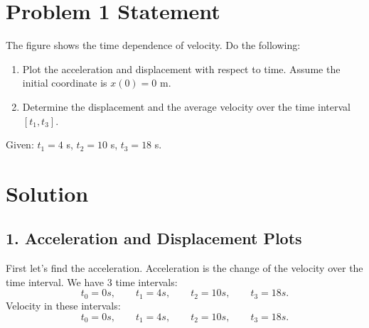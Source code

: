 \documentclass{article}
\begin{document}


\section*{Problem 1 Statement}
The figure shows the time dependence of velocity. Do the following:

\begin{enumerate}
    \item Plot the acceleration and displacement with respect to time. Assume the initial coordinate is $x(0) = 0$ m.
    \item Determine the displacement and the average velocity over the time interval $[t_1, t_3]$.
\end{enumerate}

Given: $t_1 = 4$ s, $t_2 = 10$ s, $t_3 = 18$ s.

\section*{Solution}

\subsection*{1. Acceleration and Displacement Plots}
First let's find the acceleration. Acceleration is the change of the velocity over the time interval.
We have 3 time intervals: 
\[
t_0 = 0s, \qquad t_1 = 4s, \qquad t_2 = 10s, \qquad t_3 = 18s.
\]
Velocity in these intervals:
\[
t_0 = 0s, \qquad t_1 = 4s, \qquad t_2 = 10s, \qquad t_3 = 18s.
\]
\end{document}

